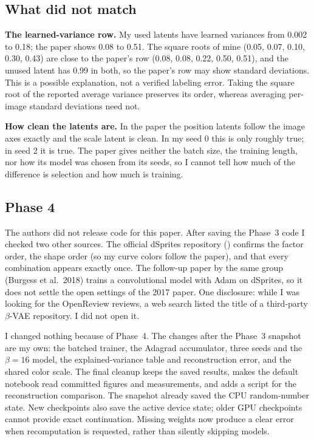 \subsection{What did not match}
\textbf{The learned-variance row.} My used latents have learned variances from 0.002 to 0.18; the paper shows 0.08 to 0.51. The square roots of mine (0.05, 0.07, 0.10, 0.30, 0.43) are close to the paper's row (0.08, 0.08, 0.22, 0.50, 0.51), and the unused latent has 0.99 in both, so the paper's row may show standard deviations. This is a possible explanation, not a verified labeling error. Taking the square root of the reported average variance preserves its order, whereas averaging per-image standard deviations need not.

\textbf{How clean the latents are.} In the paper the position latents follow the image axes exactly and the scale latent is clean. In my seed 0 this is only roughly true; in seed 2 it is true. The paper gives neither the batch size, the training length, nor how its model was chosen from its seeds, so I cannot tell how much of the difference is selection and how much is training.


\subsection{Phase 4}
The authors did not release code for this paper. After saving the Phase~3 code I checked two other sources. The official dSprites repository () confirms the factor order, the shape order (so my curve colors follow the paper), and that every combination appears exactly once. The follow-up paper by the same group (Burgess et al.\ 2018) trains a convolutional model with Adam on dSprites, so it does not settle the open settings of the 2017 paper. One disclosure: while I was looking for the OpenReview reviews, a web search listed the title of a third-party $\beta$-VAE repository. I did not open it.

I changed nothing because of Phase~4. The changes after the Phase~3 snapshot are my own: the batched trainer, the Adagrad accumulator, three seeds and the $\beta=16$ model, the explained-variance table and reconstruction error, and the shared color scale. The final cleanup keeps the saved results, makes the default notebook read committed figures and measurements, and adds a script for the reconstruction comparison. The snapshot already saved the CPU random-number state. New checkpoints also save the active device state; older GPU checkpoints cannot provide exact continuation. Missing weights now produce a clear error when recomputation is requested, rather than silently skipping models.

